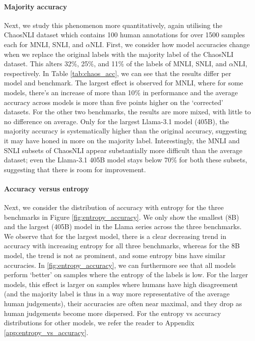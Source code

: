 \paragraph{Majority accuracy} 
Next, we study this phenomenon more quantitatively, again utilising the ChaosNLI dataset which contains 100 human annotations for over 1500 samples each for MNLI, SNLI, and $\alpha$NLI.
First, we consider how model accuracies change when we replace the original labels with the majority label of the ChaosNLI dataset.
This alters 32\%, 25\%, and 11\% of the labels of MNLI, SNLI, and $\alpha$NLI, respectively.
In Table \ref{tab:chaos_acc}, we can see that the results differ per model and benchmark.
The largest effect is observed for MNLI, where for some models, there's an increase of more than 10\% in performance and the average accuracy across models is more than five points higher on the `corrected' datasets.
For the other two benchmarks, the results are more mixed, with little to no difference on average.
Only for the largest Llama-3.1 model (405B), the majority accuracy is systematically higher than the original accuracy, suggesting it may have honed in more on the majority label.
Interestingly, the MNLI and SNLI subsets of ChaosNLI appear substantially more difficult than the average dataset; even the Llama-3.1 405B model stays below 70\% for both these subsets, suggesting that there is room for improvement.

\paragraph{Accuracy versus entropy}
Next, we consider the distribution of accuracy with entropy for the three benchmarks in Figure \ref{fig:entropy_accuracy}. 
We only show the smallest (8B) and the largest (405B) model in the Llama series across the three benchmarks. 
We observe that for the largest model, there is a clear decreasing trend in accuracy with increasing entropy for all three benchmarks, whereas for the 8B model, the trend is not as prominent, and some entropy bins have similar accuracies. 
In \cref{fig:entropy_accuracy}, we can furthermore see that all models perform `better' on samples where the entropy of the labels is low.
For the larger models, this effect is larger on samples where humans have high disagreement (and the majority label is thus in a way more representative of the average human judgements), their accuracies are often near maximal, and they drop as human judgements become more dispersed.
For the entropy vs accuracy distributions for other models, we refer the reader to Appendix \ref{app:entropy_vs_accuracy}.

